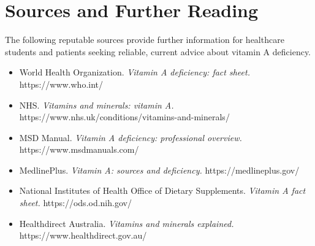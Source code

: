 \section*{Sources and Further Reading}
The following reputable sources provide further information for healthcare students and patients seeking reliable, current advice about vitamin A deficiency.

\begin{itemize}
    \item World Health Organization. \textit{Vitamin A deficiency: fact sheet.} https://www.who.int/
    \item NHS. \textit{Vitamins and minerals: vitamin A.} https://www.nhs.uk/conditions/vitamins-and-minerals/
    \item MSD Manual. \textit{Vitamin A deficiency: professional overview.} https://www.msdmanuals.com/
    \item MedlinePlus. \textit{Vitamin A: sources and deficiency.} https://medlineplus.gov/
    \item National Institutes of Health Office of Dietary Supplements. \textit{Vitamin A fact sheet.} https://ods.od.nih.gov/
    \item Healthdirect Australia. \textit{Vitamins and minerals explained.} https://www.healthdirect.gov.au/
\end{itemize}
